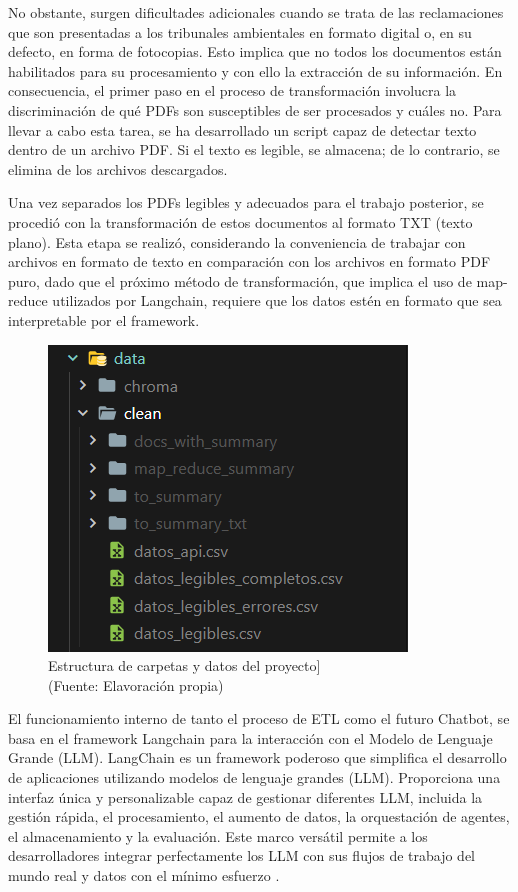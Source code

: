 \par No obstante, surgen dificultades adicionales cuando se trata de las reclamaciones que son presentadas a los tribunales ambientales 
en formato digital o, en su defecto, en forma de fotocopias. Esto implica que no todos los documentos están habilitados para su 
procesamiento y con ello la extracción de su información. En consecuencia, el primer paso en el proceso de transformación involucra la discriminación de qué PDFs son 
susceptibles de ser procesados y cuáles no. Para llevar a cabo esta tarea, se ha desarrollado un script capaz de detectar 
texto dentro de un archivo PDF. Si el texto es legible, se almacena; de lo contrario, se elimina de los archivos descargados.

\par Una vez separados los PDFs legibles y adecuados para el trabajo posterior, se procedió con la transformación de estos documentos 
al formato TXT (texto plano). Esta etapa se realizó, considerando la conveniencia de trabajar con archivos en formato de 
texto en comparación con los archivos en formato PDF puro, dado que el próximo método de transformación, que implica el uso de
map-reduce utilizados por Langchain, requiere que los datos estén en formato que sea interpretable por el framework.

 \begin{figure}[ht!]
    \centering
    \includegraphics[width=.5\textwidth]{figures/huemulFOLDERS.png}
    \caption[Estructura de carpetas y datos del proyecto]{Estructura de carpetas y datos del proyecto]\\
    {\scriptsize (Fuente: Elavoración propia)}}
    \label{fig:chatbot1}
\end{figure}

\newpage

\par El funcionamiento interno de tanto el proceso de ETL como el futuro Chatbot, se basa en el framework Langchain para la interacción con el Modelo de Lenguaje Grande (LLM). 
LangChain es un framework poderoso que simplifica el desarrollo de aplicaciones utilizando modelos de lenguaje grandes (LLM). Proporciona 
una interfaz única y personalizable capaz de gestionar diferentes LLM, incluida la gestión rápida, el procesamiento, el aumento de datos, 
la orquestación de agentes, el almacenamiento y la evaluación. Este marco versátil permite a los desarrolladores integrar perfectamente 
los LLM con sus flujos de trabajo del mundo real y datos con el mínimo esfuerzo \cite{langchain1}.

